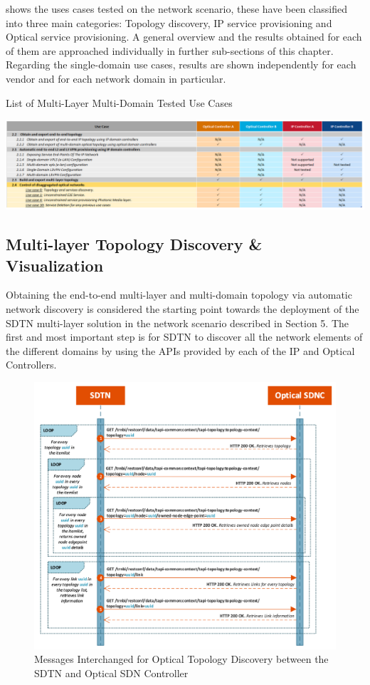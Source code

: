 \documentclass[a4paper,fleqn]{cas-dc}
\begin{document}
 shows the uses cases tested on the network scenario, these have been classified into three main categories: Topology discovery, IP service provisioning and Optical service provisioning. A general overview and the results obtained for each of them are approached individually in further sub-sections of this chapter. Regarding the single-domain use cases, results are shown independently for each vendor and for each network domain in particular.

\begin{table}
	\caption{List of Multi-Layer Multi-Domain Tested Use Cases}
	\centering
		\includegraphics[scale=0.5]{figs/tested_use_cases.png}
	\label{TAB:tested_use_cases}
\end{table}

\subsection{Multi-layer Topology Discovery \& Visualization}
Obtaining the end-to-end multi-layer and multi-domain topology via automatic network discovery is considered the starting point towards the deployment of the SDTN multi-layer solution in the network scenario described in Section 5. The first and most important step is for SDTN to discover all the network elements of the different domains by using the APIs provided by each of the IP and Optical Controllers. 

\begin{figure}
	\centering
		\includegraphics[width=\linewidth]{figs/optical_topology_workflow_2.png}
	\caption{Messages Interchanged for Optical Topology Discovery between the SDTN and Optical SDN Controller}
	\label{FIG:optical_topology_workflow}
\end{figure}
\end{document}
